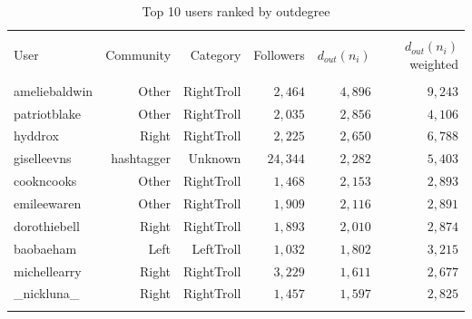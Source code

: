 \documentclass[12pt, titlepage=true, toc=bib]{scrartcl}
\begin{document}
\begin{table}[!ht] \centering 
\begin{tabular*}{.95\linewidth}{@{\extracolsep{\fill}} lrrrrr} 
\\[-1.8ex]\hline 
\hline \\[-1.8ex] 
User & Community & Category & Followers & \( d_{out}(n_{i}) \) & \( d_{out}(n_{i}) \) weighted \\ 
\hline \\[-1.8ex] 
ameliebaldwin & Other & RightTroll & $2,464$ & $4,896$ & $9,243$ \\ 
patriotblake & Other & RightTroll & $2,035$ & $2,856$ & $4,106$ \\ 
hyddrox & Right & RightTroll & $2,225$ & $2,650$ & $6,788$ \\ 
giselleevns & hashtagger & Unknown & $24,344$ & $2,282$ & $5,403$ \\ 
cookncooks & Other & RightTroll & $1,468$ & $2,153$ & $2,893$ \\ 
emileewaren & Other & RightTroll & $1,909$ & $2,116$ & $2,891$ \\ 
dorothiebell & Right & RightTroll & $1,893$ & $2,010$ & $2,874$ \\ 
baobaeham & Left & LeftTroll & $1,032$ & $1,802$ & $3,215$ \\ 
michellearry & Right & RightTroll & $3,229$ & $1,611$ & $2,677$ \\ 
\_nickluna\_ & Right & RightTroll & $1,457$ & $1,597$ & $2,825$ \\ 
\hline \\[-1.8ex] 
\end{tabular*} 
  \caption[Outdegree]{Top 10 users ranked by outdegree} 
  \label{tab:out} 
\end{table}  
\end{document}
